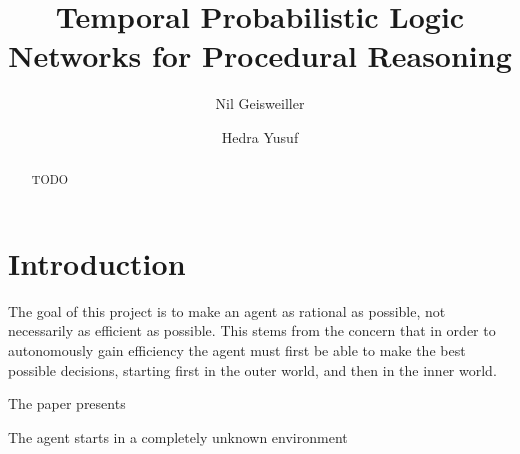 \documentclass[runningheads]{llncs}
\begin{document}
%
\title{Temporal Probabilistic Logic Networks for Procedural Reasoning}

%
\author{Nil Geisweiller
  \and Hedra Yusuf}
%
%
%
\maketitle              %
%

\begin{abstract}
  TODO

\end{abstract}

\section{Introduction}

The goal of this project is to make an agent as rational as possible,
not necessarily as efficient as possible.  This stems from the concern
that in order to autonomously gain efficiency the agent must first be
able to make the best possible decisions, starting first in the outer
world, and then in the inner world.


The paper presents

The agent starts in a completely unknown environment
\end{document}
